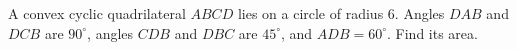 A convex cyclic quadrilateral $ABCD$ lies on a circle of radius $6$. Angles $DAB$ and $DCB$ are $90^\circ$, angles $CDB$ and $DBC$ are $45^\circ$, and $ADB=60^\circ$. Find its area.
